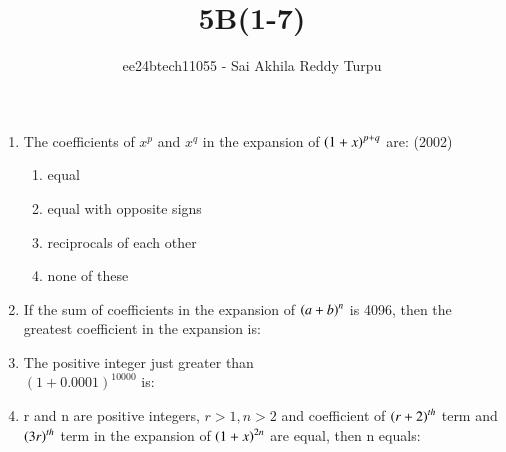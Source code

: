 \documentclass[journal,12pt,twocolumn]{IEEEtran}
\theoremstyle{remark}
\begin{document}

\vspace{3cm}

\title{5B(1-7)}
\author{ee24btech11055 - Sai Akhila Reddy Turpu}
\maketitle
\newpage
\bigskip

\renewcommand{\thefigure}{\theenumi}
\renewcommand{\thetable}{\theenumi}
\begin{enumerate}
	\item The coefficients of $x^p$ and $x^q$ in the expansion of $\left(1+x\right)^{p+q}$ are:
	\hfill{(2002)}
	\begin{enumerate}[label=(\alph*)]
		\item equal
		\item equal with opposite signs
		\item reciprocals of each other
		\item none of these
	\end{enumerate}
\item If the sum of coefficients in the expansion of $\left(a+b\right)^n$ is 4096, then the greatest coefficient in the expansion is:  
	\hfill{}
	\begin{enumerate}[label=(\alph*)]
	\end{enumerate}
\item The positive integer just greater than \\
$(1+0.0001)^{10000}$ is: 
		\hfill{}
	\begin{enumerate}[label=(\alph*)]
	\end{enumerate}
\item r and n are positive integers, $r>1, n>2$ and coefficient of $\left(r+2\right)^{th}$ term and $\left(3r\right)^{th}$ term in the expansion of $\left(1+x\right)^{2n}$ are equal, then n equals:


\end{enumerate}
\end{document}
